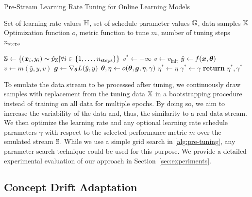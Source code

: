 \documentclass{article} %
\begin{document}
\begin{algorithm}
   \caption{Pre-Stream Learning Rate Tuning for Online Learning Models}\label{alg:pre-tuning}
   \begin{algorithmic}[1]
      \Require Set of learning rate values ${\mathbb{H}}$, set of schedule parameter values ${\mathbb{G}}$, data samples ${\mathbb{X}}$
      \Require Optimization function $o$, metric function to tune $m$, number of tuning steps $n_{\rm{steps}}$

      \State ${\mathbb{S}} \gets \{({\bm{x}}_i, y_i) \sim \hat{p}_{{\mathbb{X}}}| \forall i \in \{1, \ldots, n_{\text{steps}}\} \}$ 
      \State $v^* \gets -\infty$
      \State $v \gets v_{\textrm{init}}$ 
      \State $\hat{y} \gets f({\bm{x}}, {\bm{\theta}})$ 
      \State $v \gets m(\hat{y}, y, v)$ 
      \State ${\bm{g}} \gets \nabla_{{\bm{\theta}}} L(\hat{y}, y)$ 
      \State ${\bm{\theta}}, \eta \gets o({\bm{\theta}}, {\bm{g}}, \eta, \gamma)$ 
      \EndFor
      \State $\eta^* \gets \eta$ 
      \State $\gamma^* \gets \gamma$ 
      \EndIf
      \EndFor
      \State \textbf{return} $\eta^*, \gamma^*$ 
   \end{algorithmic}
\end{algorithm}

To emulate the data stream to be processed after tuning, we continuously draw samples with replacement from the tuning data ${\mathbb{X}}$ in a bootstrapping procedure instead of training on all data for multiple epochs.
By doing so, we aim to increase the variability of the data and, thus, the similarity to a real data stream.
We then optimize the learning rate and any optional learning rate schedule parameters $\gamma$ with respect to the selected performance metric $m$ over the emulated stream ${\mathbb{S}}$.
While we use a simple grid search in \cref{alg:pre-tuning}, any parameter search technique could be used for this purpose.
We provide a detailed experimental evaluation of our approach in Section~\ref{sec:experiments}.

\subsection{Concept Drift Adaptation}
\end{document}
